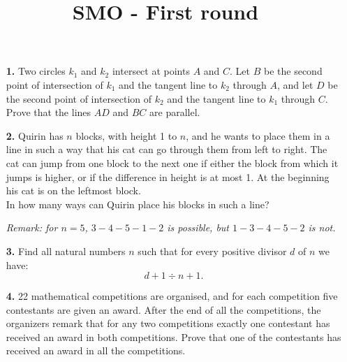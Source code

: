 \documentclass[language=english,style=exam]{smo}
\title{SMO - First round}
\begin{document}
\begin{enumerate}

\item[\textbf{1.}] 
Two circles $k_1$ and $k_2$ intersect at points $A$ and $C$. Let $B$ be the second point of intersection of $k_1$ and the tangent line to $k_2$ through $A$, and let $D$ be the second point of intersection of $k_2$ and the tangent line to $k_1$ through $C$. Prove that the lines $AD$ and $BC$ are parallel.

\bigskip

\item[\textbf{2.}] 
Quirin has $n$ blocks, with height 1 to $n$, and he wants to place them in a line in such a way that his cat can go through them from left to right. The cat can jump from one block to the next one if either the block from which it jumps is higher, or if the difference in height is at most 1. At the beginning his cat is on the leftmost block.\\
In how many ways can Quirin place his blocks in such a line?


\textit{Remark: for $n=5$, $3-4-5-1-2$ is possible, but $1-3-4-5-2$ is not.} 

\bigskip

\item[\textbf{3.}]
Find all natural numbers $n$ such that for every positive divisor $d$ of $n$ we have:
\[
d+1 \div n+1.
\]

\bigskip

\item[\textbf{4.}] 
22 mathematical competitions are organised, and for each competition five contestants are given an award. After the end of all the competitions, the organizers remark that for any two competitions exactly one contestant has received an award in both competitions. Prove that one of the contestants has received an award in all the competitions.


\end{enumerate}
\end{document}
